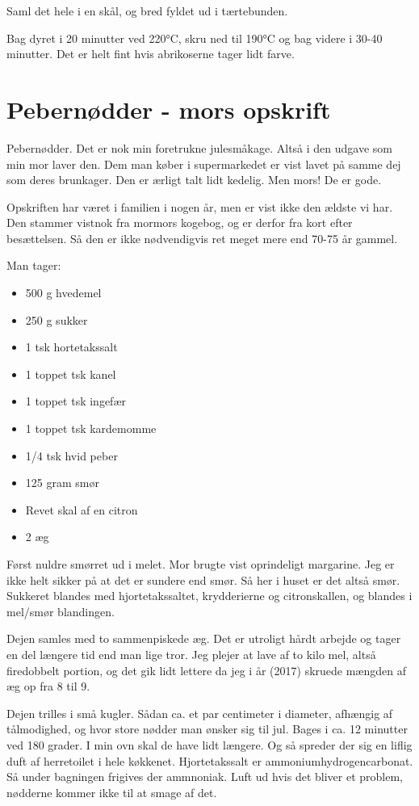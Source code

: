 \documentclass[
]{book}
\providecommand{\tightlist}{%
  \setlength{\itemsep}{0pt}\setlength{\parskip}{0pt}}
\begin{document}
Saml det hele i en skål, og bred fyldet ud i tærtebunden.

Bag dyret i 20 minutter ved 220°C, skru ned til 190°C og bag videre i 30-40 minutter. Det er helt fint hvis abrikoserne tager lidt farve.

\section{Pebernødder - mors opskrift}\label{pebernuxf8dder---mors-opskrift}

Pebernødder. Det er nok min foretrukne julesmåkage. Altså i den udgave som min mor laver den. Dem man køber i supermarkedet er vist lavet på samme dej som deres brunkager. Den er ærligt talt lidt kedelig. Men mors! De er gode.

Opskriften har været i familien i nogen år, men er vist ikke den ældste vi har. Den stammer vistnok fra mormors kogebog, og er derfor fra kort efter besættelsen. Så den er ikke nødvendigvis ret meget mere end 70-75 år gammel.

Man tager:

\begin{itemize}
\tightlist
\item
  500 g hvedemel
\item
  250 g sukker
\item
  1 tsk hortetakssalt
\item
  1 toppet tsk kanel
\item
  1 toppet tsk ingefær
\item
  1 toppet tsk kardemomme
\item
  1/4 tsk hvid peber
\item
  125 gram smør
\item
  Revet skal af en citron
\item
  2 æg
\end{itemize}

Først nuldre smørret ud i melet. Mor brugte vist oprindeligt margarine. Jeg er ikke helt sikker på at det er sundere end smør. Så her i huset er det altså smør. Sukkeret blandes med hjortetakssaltet, krydderierne og citronskallen, og blandes i mel/smør blandingen.

Dejen samles med to sammenpiskede æg. Det er utroligt hårdt arbejde og tager en del længere tid end man lige tror. Jeg plejer at lave af to kilo mel, altså firedobbelt portion, og det gik lidt lettere da jeg i år (2017) skruede mængden af æg op fra 8 til 9.

Dejen trilles i små kugler. Sådan ca. et par centimeter i diameter, afhængig af tålmodighed, og hvor store nødder man ønsker sig til jul. Bages i ca. 12 minutter ved 180 grader. I min ovn skal de have lidt længere. Og så spreder der sig en liflig duft af herretoilet i hele køkkenet. Hjortetakssalt er ammoniumhydrogencarbonat. Så under bagningen frigives der ammnoniak. Luft ud hvis det bliver et problem, nødderne kommer ikke til at smage af det.
\end{document}
